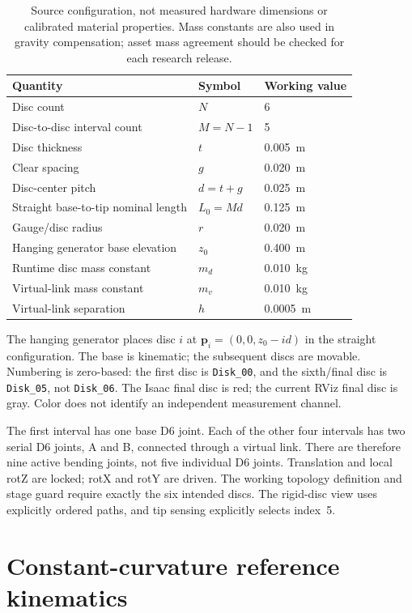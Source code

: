 \documentclass[11pt,letterpaper]{article}
\begin{document}
\begin{table}[htbp]
\centering
\begin{tabular}{lll}
\toprule
Quantity & Symbol & Working value\\\midrule
Disc count & $N$ & 6\\
Disc-to-disc interval count & $M=N-1$ & 5\\
Disc thickness & $t$ & 0.005~m\\
Clear spacing & $g$ & 0.020~m\\
Disc-center pitch & $d=t+g$ & 0.025~m\\
Straight base-to-tip nominal length & $L_0=Md$ & 0.125~m\\
Gauge/disc radius & $r$ & 0.020~m\\
Hanging generator base elevation & $z_0$ & 0.400~m\\
Runtime disc mass constant & $m_d$ & 0.010~kg\\
Virtual-link mass constant & $m_v$ & 0.010~kg\\
Virtual-link separation & $h$ & 0.0005~m\\
\bottomrule
\end{tabular}
\caption{Source configuration, not measured hardware dimensions or calibrated
material properties. Mass constants are also used in gravity compensation;
asset mass agreement should be checked for each research release.}
\end{table}

The hanging generator places disc $i$ at
$\mathbf{p}_i=(0,0,z_0-id)$ in the straight configuration. The base is kinematic;
the subsequent discs are movable. Numbering is zero-based: the first disc is
\texttt{Disk\_00}, and the sixth/final disc is \texttt{Disk\_05}, not
\texttt{Disk\_06}. The Isaac final disc is red; the current RViz final disc is
gray. Color does not identify an independent measurement channel.

The first interval has one base D6 joint. Each of the other four intervals
has two serial D6 joints, A and B, connected through a virtual link. There are
therefore nine active bending joints, not five individual D6 joints.
Translation and local rotZ are locked; rotX and rotY are driven. The working
topology definition and stage guard require exactly the six intended discs.
The rigid-disc view uses explicitly ordered paths, and tip sensing explicitly
selects index~5.

\section{Constant-curvature reference kinematics}
\end{document}
